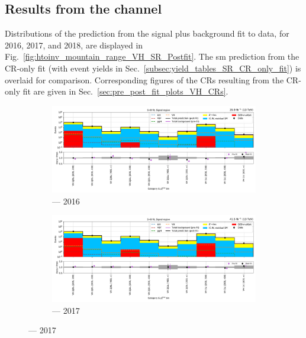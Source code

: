 \subsection{Results from the \texorpdfstring{\VH}{VH} channel}
\label{subsec:htoinv_results_VH}

Distributions of the prediction from the signal plus background fit to data, for 2016, 2017, and 2018, are displayed in Fig.~\ref{fig:htoinv_mountain_range_VH_SR_Postfit}. The \acrshort{sm} prediction from the \gls{CR}-only fit (with event yields in Sec.~\ref{subsec:yield_tables_SR_CR_only_fit}) is overlaid for comparison. Corresponding figures of the \glspl{CR} resulting from the \gls{CR}-only fit are given in Sec.~\ref{sec:pre_post_fit_plots_VH_CRs}.

\begin{figure}[htbp]
    \centering
    \begin{subfigure}[b]{0.9\textwidth}
        \includegraphics[width=\textwidth]{figures/mountain_ranges/2016/VH/SR_tree_fit_s-abs_values_VH_cats.pdf}
        \caption{\VH --- 2016}
    \end{subfigure}

    \begin{subfigure}[b]{0.9\textwidth}
        \includegraphics[width=\textwidth]{figures/mountain_ranges/2017/VH/SR_tree_fit_s-abs_values_VH_cats.pdf}
        \caption{\VH --- 2017}
    \end{subfigure}


\end{figure}
